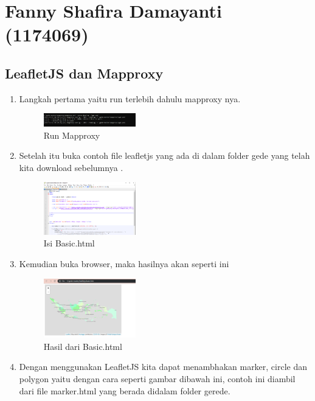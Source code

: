 \section{Fanny Shafira Damayanti (1174069)}
\subsection{LeafletJS dan Mapproxy}
\begin{enumerate}
    \item Langkah pertama yaitu run terlebih dahulu mapproxy nya.
  \hfill\break
  \begin{figure}[H]
  \includegraphics[width=4cm]{figures/tugas5/1174069/1.png}
  \centering
  \caption{Run Mapproxy}
  \end{figure}
    
   

    \item Setelah itu buka contoh file leafletjs yang ada di dalam folder gede  yang telah kita download sebelumnya .
    
  \hfill\break
  \begin{figure}[H]
  \includegraphics[width=4cm]{figures/tugas5/1174069/2.png}
  \centering
  \caption{Isi Basic.html}
  \end{figure}
    
    \item Kemudian buka browser, maka hasilnya akan seperti ini
    
  \hfill\break
  \begin{figure}[H]
  \includegraphics[width=4cm]{figures/tugas5/1174069/3.png}
  \centering
  \caption{Hasil dari Basic.html}
  \end{figure}
  
   \item Dengan menggunakan LeafletJS kita dapat menambhakan marker, circle dan polygon yaitu dengan cara seperti gambar dibawah ini, contoh ini diambil dari file marker.html yang berada didalam folder gerede.
    

\end{enumerate}
